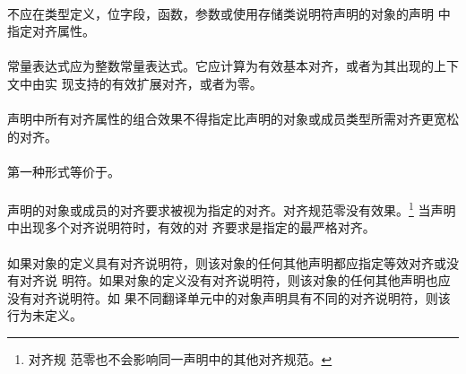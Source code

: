 {\constraint
\paragraph{}
不应在类型定义，位字段，函数，参数或使用存储类说明符声明的对象的声明
中指定对齐属性。

\paragraph{}
常量表达式应为整数常量表达式。它应计算为有效基本对齐，或者为其出现的上下文中由实
现支持的有效扩展对齐，或者为零。

\paragraph{}
声明中所有对齐属性的组合效果不得指定比声明的对象或成员类型所需对齐更宽松的对齐。

\semantic
\paragraph{}
第一种形式等价于\tm{))}。

\paragraph{}
声明的对象或成员的对齐要求被视为指定的对齐。对齐规范零没有效果。\footnote{对齐规
范零也不会影响同一声明中的其他对齐规范。} 当声明中出现多个对齐说明符时，有效的对
齐要求是指定的最严格对齐。

\paragraph{}
如果对象的定义具有对齐说明符，则该对象的任何其他声明都应指定等效对齐或没有对齐说
明符。如果对象的定义没有对齐说明符，则该对象的任何其他声明也应没有对齐说明符。如
果不同翻译单元中的对象声明具有不同的对齐说明符，则该行为未定义。

\syntax
}
